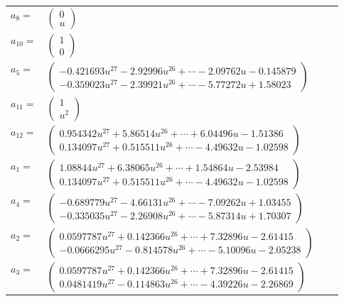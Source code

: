 \documentclass[1p]{elsarticle_modified}
\theoremstyle{definition}
\begin{document}
\begin{tabular}{m{7pt} m{180pt} m{7pt} m{180pt} }
\flushright $a_{8}=$&$\begin{pmatrix}0\\u\end{pmatrix}$ \\
\flushright $a_{10}=$&$\begin{pmatrix}1\\0\end{pmatrix}$ \\
\flushright $a_{5}=$&$\begin{pmatrix}-0.421693 u^{27}-2.92996 u^{26}+\cdots-2.09762 u-0.145879\\-0.359023 u^{27}-2.39921 u^{26}+\cdots-5.77272 u+1.58023\end{pmatrix}$ \\
\flushright $a_{11}=$&$\begin{pmatrix}1\\u^2\end{pmatrix}$ \\
\flushright $a_{12}=$&$\begin{pmatrix}0.954342 u^{27}+5.86514 u^{26}+\cdots+6.04496 u-1.51386\\0.134097 u^{27}+0.515511 u^{26}+\cdots-4.49632 u-1.02598\end{pmatrix}$ \\
\flushright $a_{1}=$&$\begin{pmatrix}1.08844 u^{27}+6.38065 u^{26}+\cdots+1.54864 u-2.53984\\0.134097 u^{27}+0.515511 u^{26}+\cdots-4.49632 u-1.02598\end{pmatrix}$ \\
\flushright $a_{4}=$&$\begin{pmatrix}-0.689779 u^{27}-4.66131 u^{26}+\cdots-7.09262 u+1.03455\\-0.335035 u^{27}-2.26908 u^{26}+\cdots-5.87314 u+1.70307\end{pmatrix}$ \\
\flushright $a_{2}=$&$\begin{pmatrix}0.0597787 u^{27}+0.142366 u^{26}+\cdots+7.32896 u-2.61415\\-0.0666295 u^{27}-0.814578 u^{26}+\cdots-5.10096 u-2.05238\end{pmatrix}$ \\
\flushright $a_{3}=$&$\begin{pmatrix}0.0597787 u^{27}+0.142366 u^{26}+\cdots+7.32896 u-2.61415\\0.0481419 u^{27}-0.114863 u^{26}+\cdots-4.39226 u-2.26869\end{pmatrix}$ \\

\end{tabular}
\end{document}
